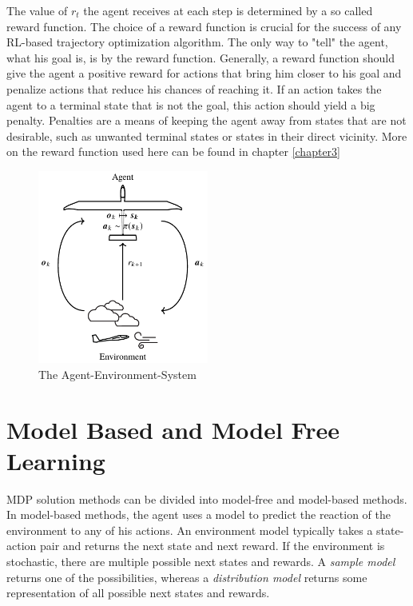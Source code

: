 The value of $r_t$ the agent receives at each step is determined by a so called reward function. The choice of a reward function is crucial for the success of any RL-based trajectory optimization algorithm. The only way to "tell" the agent, what his goal is, is by the reward function. Generally, a reward function should give the agent a positive reward for actions that bring him closer to his goal and penalize actions that reduce his chances of reaching it. If an action takes the agent to a terminal state that is not the goal, this action should yield a big penalty. Penalties are a means of keeping the agent away from states that are not desirable, such as unwanted terminal states or states in their direct vicinity. More on the reward function used here can be found in chapter \ref{chapter3} 

\begin{figure}[h]
	\centering
	\includegraphics[width=0.5\textwidth]{src/pics/RLProblem.pdf}
	\caption{The Agent-Environment-System \cite{Notter2018}}
	\label{fig:agent_env_system} 
\end{figure}

\section{Model Based and Model Free Learning}

MDP solution methods can be divided into model-free and model-based methods. In model-based methods, the agent uses a model to predict the reaction of the environment to any of his actions. An environment model typically takes a state-action pair and returns the next state and next reward. If the environment is stochastic, there are multiple possible next states and rewards. A \textit{sample model} returns one of the possibilities, whereas a \textit{distribution model} returns some representation of all possible next states and rewards.

